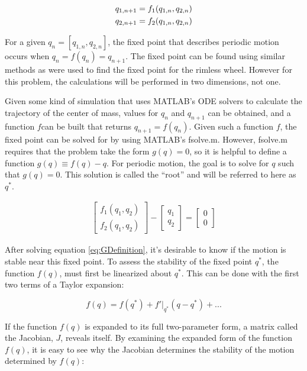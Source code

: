 \begin{align}
q_{1,n+1}= f_{1}(q_{1,n},q_{2,n}) \notag \\
q_{2,n+1}=  f_{2}(q_{1,n},q_{2,n})
\label{eq:FullFunctionDefinition}
\end{align}

For a given $q_{n}=[q_{1,n},q_{2,n}]$, the fixed point that describes periodic motion occurs when $q_{n}=f(q_{n})=q_{n+1}$. The fixed point can be found using similar methods as were used to find the fixed point for the rimless wheel. However for this problem, the calculations will be performed in two dimensions, not one.

Given some kind of simulation that uses MATLAB's ODE solvers to calculate the
trajectory of the center of mass, values for $q_{n}$ and $q_{n+1}$ can be
obtained, and a function $f$can be built that returns $q_{n+1}=f(q_{n})$. Given
such a function $f$, the fixed point can be solved for by using MATLAB's
fsolve.m. However, fsolve.m requires that the problem take the form $g(q)=0$,
so it is helpful to define a function $g(q)\equiv f(q)-q$. For periodic motion,
the goal is to solve for $q$ such that $g(q)=0$. This solution is called the
``root'' and will be referred to here as $q^{*}$.

 \begin{align}
 \begin{bmatrix}
 f_{1}(q_{1},q_{2}) \\
 f_{2}(q_{1},q_{2})
 \end{bmatrix}
 -
 \begin{bmatrix}
 q_{1} \\
 q_{2}
 \end{bmatrix}
 =
 \begin{bmatrix}
 0 \\
 0
\end{bmatrix}
\label{eq:GDefinition}
\end{align}


After solving equation \ref{eq:GDefinition}, it's desirable to know if the motion is stable near this fixed point. To assess the stability of the fixed point $q^{*}$, the function $f(q)$, must first be linearized about $q^{*}$. This can be done with the first two terms of a Taylor expansion:

\begin{equation}
f ( q ) = f ( q^{*} ) + f' |_{q^{*}} ( q - q^{*} ) + ...
\label{eq:LinearShorthand}
\end{equation}

If the function $f(q)$ is expanded to its full two-parameter form, a matrix called the Jacobian, $J$, reveals itself. By examining the expanded form of the function $f(q)$, it is easy to see why the Jacobian determines the stability of the motion determined by $f(q)$:

